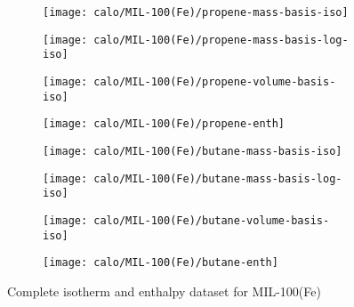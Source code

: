 \begin{figure}[H]
    \begin{subfigure}{0.25\textwidth}
        \texttt{[image: calo/MIL-100(Fe)/propene-mass-basis-iso]}%
        \label{appx:fig:shaping:mil100c3h6mass}
    \end{subfigure}%
    \begin{subfigure}{0.25\textwidth}
        \texttt{[image: calo/MIL-100(Fe)/propene-mass-basis-log-iso]}%
        \label{appx:fig:shaping:mil100c3h6masslog}
    \end{subfigure}%
    \begin{subfigure}{0.25\textwidth}
        \texttt{[image: calo/MIL-100(Fe)/propene-volume-basis-iso]}%
        \label{appx:fig:shaping:mil100c3h6volume}
    \end{subfigure}%
    \begin{subfigure}{0.25\textwidth}
        \texttt{[image: calo/MIL-100(Fe)/propene-enth]}%
        \label{appx:fig:shaping:mil100c3h6enth}
    \end{subfigure}%

    \begin{subfigure}{0.25\textwidth}
        \texttt{[image: calo/MIL-100(Fe)/butane-mass-basis-iso]}%
        \label{appx:fig:shaping:mil100c4h10mass}
    \end{subfigure}%
    \begin{subfigure}{0.25\textwidth}
        \texttt{[image: calo/MIL-100(Fe)/butane-mass-basis-log-iso]}%
        \label{appx:fig:shaping:mil100c4h10masslog}
    \end{subfigure}%
    \begin{subfigure}{0.25\textwidth}
        \texttt{[image: calo/MIL-100(Fe)/butane-volume-basis-iso]}%
        \label{appx:fig:shaping:mil100c4h10volume}
    \end{subfigure}%
    \begin{subfigure}{0.25\textwidth}
        \texttt{[image: calo/MIL-100(Fe)/butane-enth]}%
        \label{appx:fig:shaping:mil100c4h10enth}
    \end{subfigure}%

    \caption{Complete isotherm and enthalpy dataset for MIL-100(Fe)}%
    \label{appx:fig:shaping:calomil100}
\end{figure}

